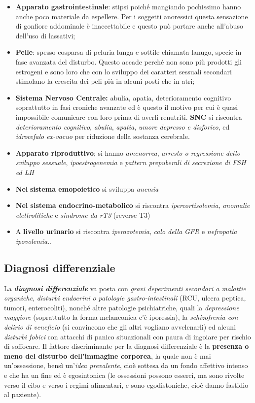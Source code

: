 \begin{itemize}
\item
  \textbf{Apparato gastrointestinale}: stipsi poiché mangiando
  pochissimo hanno anche poco materiale da espellere. Per i soggetti
  anoressici questa sensazione di gonfiore addominale è inaccettabile e
  questo può portare anche all'abuso dell'uso di lassativi;
\item
  \textbf{Pelle}: spesso cosparsa di peluria lunga e sottile chiamata
  lanugo, specie in fase avanzata del disturbo. Questo accade perché non
  sono più prodotti gli estrogeni e sono loro che con lo sviluppo dei
  caratteri sessuali secondari stimolano la crescita dei peli più in
  alcuni posti che in atri;
\item
  \textbf{Sistema Nervoso Centrale:} abulia, apatia, deterioramento
  cognitivo soprattutto in fasi croniche avanzate ed è questo il motivo
  per cui è quasi impossibile comunicare con loro prima di averli
  renutriti. \textbf{SNC} si riscontra \emph{deterioramento cognitivo},
  \emph{abulia}, \emph{apatia}, \emph{umore depresso e disforico}, ed
  \emph{idrocefalo ex-vacuo} per riduzione della sostanza cerebrale.
\item
  \textbf{Apparato riproduttivo}; si hanno \emph{amenorrea},
  \emph{arresto o regressione dello sviluppo sessuale},
  \emph{ipoestrogenemia} e \emph{pattern prepuberali di secrezione di
  FSH ed LH}
\item
  \textbf{Nel} \textbf{sistema emopoietico} si sviluppa \emph{anemia}
\item
  \textbf{Nel sistema endocrino-metabolico} si riscontra
  \emph{ipercortisolemia}, \emph{anomalie elettrolitiche} e
  \emph{sindrome da rT3} (reverse T3)
\item
  A \textbf{livello urinario} si riscontra \emph{iperazotemia},
  \emph{calo della GFR} e \emph{nefropatia ipovolemia}..
\end{itemize}

\subsection{Diagnosi differenziale}

La \textbf{\emph{diagnosi differenziale}} va posta con \emph{gravi
deperimenti secondari a malattie organiche}, \emph{disturbi endocrini o
patologie gastro-intestinali} (RCU, ulcera peptica, tumori,
enterocoliti), nonché altre patologie psichiatriche, quali la
\emph{depressione maggiore} (soprattutto la forma melanconica c'è
iporessia), la \emph{schizofrenia con delirio di veneficio} (si
convincono che gli altri vogliano avvelenarli) ed alcuni \emph{disturbi
fobici} con attacchi di panico situazionali con paura di ingoiare per
rischio di soffocare. Il fattore discriminante per la diagnosi
differenziale è la \textbf{presenza o meno del disturbo dell'immagine
corporea}, la quale non è mai un'ossessione, bensì un'\emph{idea
prevalente}, cioè sottesa da un fondo affettivo intenso e che ha un fine
ed è egosintonica (le ossessioni possono esserci, ma sono rivolte verso
il cibo e verso i regimi alimentari, e sono egodistoniche, cioè danno
fastidio al paziente).

